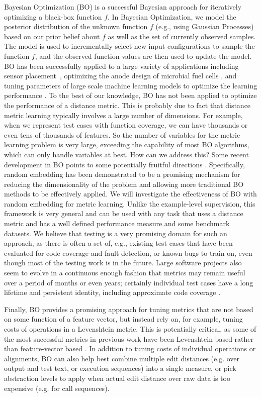 Bayesian Optimization (BO) is a successful Bayesian approach for
iteratively optimizing a black-box function $f$. In Bayesian
Optimization, we model the posterior distribution of the unknown
function $f$ (e.g., using Gaussian Processes) based on our prior
belief about $f$ as well as the set of currently observed samples. The
model is used to incrementally select new input configurations to
sample the function $f$, and the observed function values are then
used to update the model. BO has been successfully applied to a large
variety of applications including sensor
placement~\cite{krause2008near}, optimizing the anode design of
microbial fuel cells \cite{azimi2010myopic}, and tuning parameters of
large scale machine learning models to optimize the learning
performance \cite{snoek2012practical}. To the best of our knowledge,
BO has not been applied to optimize the performance of a distance
metric.  This is probably due to fact that distance metric learning
typically involves a large number of dimensions. For example, when we
represent test cases with function coverage, we can have thousands or
even tens of thousands of features. So the number of variables for the
metric learning problem is very large, exceeding the capability of
most BO algorithms, which can only handle variables at best. How can
we address this? Some recent development in BO points to some
potentially fruitful directions \cite{Wang:2013b}. Specifically,
random embedding has been demonstrated to be a promising mechanism for
reducing the dimensionality of the problem and allowing more
traditional BO methods to be effectively applied. We will investigate
the effectiveness of BO with random embedding for metric
learning. Unlike the example-level supervision, this framework is very
general and can be used with any task that uses a distance metric and
has a well defined performance measure and some benchmark datasets. We
believe that testing is a very promising domain for such an approach,
as there is often a set of, e.g., existing test cases that have been
evaluated for code coverage and fault detection, or known bugs to
train on, even though most of the testing work is in the future.
Large software projects also seem to evolve in a continuous enough
fashion that metrics may remain useful over a period of months or even
years; certainly individual test cases have a long
lifetime and persistent identity, including approximate code coverage \cite{icst2014}.

Finally, BO provides a promising approach for tuning metrics that are
not based on some function of a feature vector, but instead rely on,
for example, tuning costs of operations in a Levenshtein \cite{lev}
metric.  This is potentially critical, as some of the most successful
metrics in previous work have been Levenshtein-based rather than
feature-vector based \cite{ChakiLev,PLDI13}.  In addition to tuning
costs of individual operations or alignments, BO can also help best
combine multiple edit distances (e.g. over output and test text, or
execution sequences) into a single measure, or pick abstraction levels
to apply when actual edit distance over raw data is too expensive
(e.g. for call sequences).
